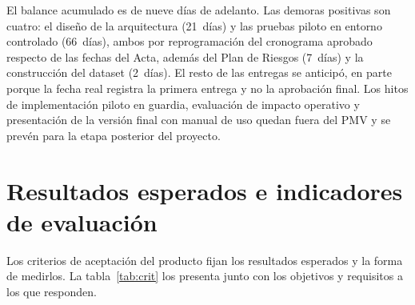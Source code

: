 El balance acumulado es de nueve días de adelanto. Las demoras positivas son cuatro: el diseño de la arquitectura (21~días) y las pruebas piloto en entorno controlado (66~días), ambos por reprogramación del cronograma aprobado respecto de las fechas del Acta, además del Plan de Riesgos (7~días) y la construcción del dataset (2~días). El resto de las entregas se anticipó, en parte porque la fecha real registra la primera entrega y no la aprobación final. Los hitos de implementación piloto en guardia, evaluación de impacto operativo y presentación de la versión final con manual de uso quedan fuera del PMV y se prevén para la etapa posterior del proyecto.

\section{Resultados esperados e indicadores de evaluación}

Los criterios de aceptación del producto fijan los resultados esperados y la forma de medirlos. La tabla~\ref{tab:crit} los presenta junto con los objetivos y requisitos a los que responden.

